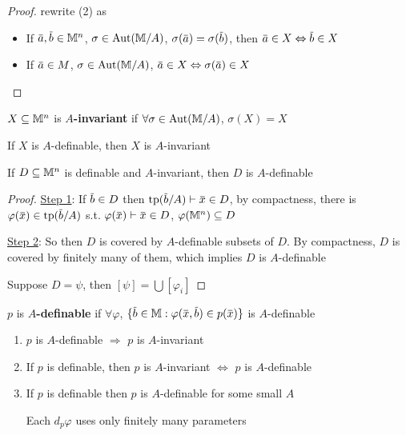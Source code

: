 \documentclass[11pt]{article}
\begin{document}
\begin{proof}
rewrite (2) as
\begin{itemize}
\item If \(\bara,\barb\in\M^n\), \(\sigma\in\operatorname{\text{Aut}}(\mathbb{M}/A)\), \(\sigma(\bara)=\sigma(\barb)\),
then \(\bara\in X\Leftrightarrow\barb\in X\)
\item If \(\bara\in M\), \(\sigma\in\operatorname{\text{Aut}}(\mathbb{M}/A)\), \(\bara\in X\Leftrightarrow\sigma(\bara)\in X\)
\end{itemize}
\end{proof}

\begin{definition}[]
\(X\subseteq\mathbb{M}^n\) is \textbf{\(A\)-invariant} if \(\forall\sigma\in\operatorname{\text{Aut}}(\mathbb{M}/A)\), \(\sigma(X)=X\)
\end{definition}

\begin{examplle}[]
If \(X\) is \(A\)-definable, then \(X\) is \(A\)-invariant
\end{examplle}

\begin{lemma}[]
\label{3.10.10}
If \(D\subseteq\mathbb{M}^n\) is definable and \(A\)-invariant, then \(D\) is \(A\)-definable
\end{lemma}

\begin{proof}
\uline{Step 1}: If \(\barb\in D\) then \(\tp(\barb/A)\vdash\barx\in D\), by compactness, there
is \(\varphi(\barx)\in\tp(\barb/A)\) s.t. \(\varphi(\barx)\vdash \barx\in D\), \(\varphi(\mathbb{M}^n)\subseteq D\)

\uline{Step 2}: So then \(D\) is covered by \(A\)-definable subsets of \(D\). By compactness, \(D\) is
covered by finitely many of them, which implies \(D\) is \(A\)-definable

Suppose \(D=\psi\), then \([\psi]=\bigcup[\varphi_i]\)
\end{proof}

\begin{definition}[]
\(p\) is \textbf{\(A\)-definable} if \(\forall\varphi\), \(\{\barb\in\M:\varphi(\barx,\barb)\in p(\barx)\}\) is \(A\)-definable
\end{definition}

\begin{remark}
\begin{enumerate}
\item \(p\) is \(A\)-definable \(\Rightarrow\) \(p\) is \(A\)-invariant
\item If \(p\) is definable, then \(p\) is \(A\)-invariant \(\Leftrightarrow\) \(p\) is \(A\)-definable
\item If \(p\) is definable then \(p\) is \(A\)-definable for some small \(A\)

Each \(d_p\varphi\) uses only finitely many parameters
\end{enumerate}
\end{remark}
\end{document}
